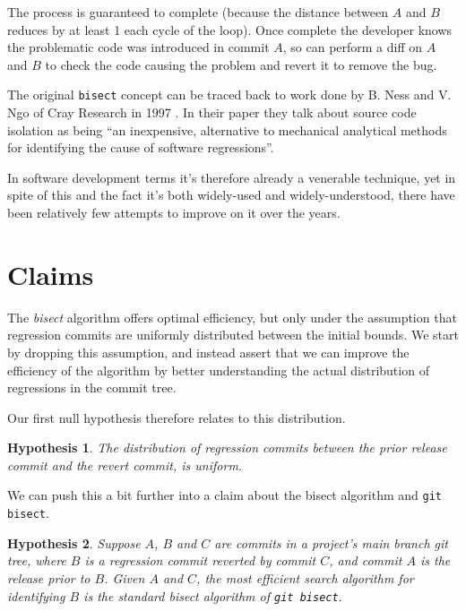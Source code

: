 \documentclass[pdflatex, sn-mathphys, referee]{sn-jnl}%
\theoremstyle{thmstyleone}%
\theoremstyle{thmstyletwo}%
\theoremstyle{thmstylethree}%
\def\code{\tt}
\theoremstyle{thmstyleone}
\newtheorem{hypothesis}{Hypothesis}
\begin{document}
The process is guaranteed to complete (because the distance between $A$ and $B$ reduces by at least 1 each cycle of the loop). Once complete the developer knows the problematic code was introduced in commit $A$, so can perform a diff on $A$ and $B$ to check the code causing the problem and revert it to remove the bug.

The original {\code bisect} concept can be traced back to work done by B. Ness and V. Ngo of Cray Research in 1997 \cite{ness1997}. In their paper they talk about source code isolation as being ``an inexpensive, alternative to mechanical analytical methods for identifying the cause of software regressions''.

In software development terms it's therefore already a venerable technique, yet in spite of this and the fact it's both widely-used and widely-understood, there have been relatively few attempts to improve on it over the years.

\section{Claims}

The {\it bisect\/} algorithm offers optimal efficiency, but only under the assumption that regression commits are uniformly distributed between the initial bounds. We start by dropping this assumption, and instead assert that we can improve the efficiency of the algorithm by better understanding the actual distribution of regressions in the commit tree.

Our first null hypothesis therefore relates to this distribution.

\begin{hypothesis}
\label{hyp:uniform}
The distribution of regression commits between the prior release commit and the revert commit, is uniform.
\end{hypothesis}

We can push this a bit further into a claim about the bisect algorithm and {\code git bisect}.

\begin{hypothesis}
\label{hyp:efficiency}
Suppose $A$, $B$ and $C$ are commits in a project's main branch git tree, where $B$ is a regression commit reverted by commit $C$, and commit $A$ is the release prior to $B$. Given $A$ and $C$, the most efficient search algorithm for identifying $B$ is the standard {\it bisect\/} algorithm of {\code git bisect}.
\end{hypothesis}
\end{document}
